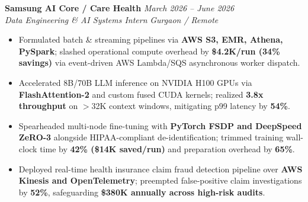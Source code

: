 \documentclass[9.5pt,a4paper]{article}
\begin{document}
\vspace{2.0pt}
\noindent\textbf{Samsung AI Core / Care Health} \hfill {\small\textit{March 2026 -- June 2026}}\\
\textit{Data Engineering \& AI Systems Intern} \hfill {\footnotesize\textit{Gurgaon / Remote}}
\begin{itemize}
    \item Formulated batch \& streaming pipelines via \textbf{AWS S3, EMR, Athena, PySpark}; slashed operational compute overhead by \textbf{\$4.2K/run (34\% savings)} via event-driven AWS Lambda/SQS asynchronous worker dispatch.
    \item Accelerated 8B/70B LLM inference on NVIDIA H100 GPUs via \textbf{FlashAttention-2} and custom fused CUDA kernels; realized \textbf{3.8x throughput} on $>$32K context windows, mitigating p99 latency by \textbf{54\%}.
    \item Spearheaded multi-node fine-tuning with \textbf{PyTorch FSDP and DeepSpeed ZeRO-3} alongside HIPAA-compliant de-identification; trimmed training wall-clock time by \textbf{42\% (\$14K saved/run)} and preparation overhead by \textbf{65\%}.
    \item Deployed real-time health insurance claim fraud detection pipeline over \textbf{AWS Kinesis and OpenTelemetry}; preempted false-positive claim investigations by \textbf{52\%}, safeguarding \textbf{\$380K annually across high-risk audits}.
\end{itemize}
\end{document}
